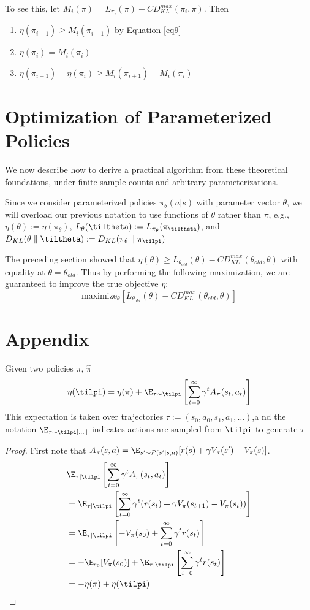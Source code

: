 \documentclass[11pt]{article}
\begin{document}
To see this, let \(M_i(\pi)=L_{\pi_i}(\pi)-CD_{KL}^{max}(\pi_i,\pi)\). Then
\begin{enumerate}
\item \(\eta(\pi_{i+1})\ge M_i(\pi_{i+1})\) by Equation \eqref{eq9}
\item \(\eta(\pi_i)=M_i(\pi_i)\)
\item \(\eta(\pi_{i+1})-\eta(\pi_i)\ge M_i(\pi_{i+1})-M_i(\pi_i)\)
\end{enumerate}
\section{Optimization of Parameterized Policies}
\label{sec:org5462e45}
We now describe how to derive a practical algorithm from these theoretical foundations, under finite
sample counts and arbitrary parameterizations.

Since we consider parameterized policies \(\pi_\theta(a|s)\) with parameter vector \(\theta\), we will overload our previous
notation to use functions of \(\theta\) rather than \(\pi\), e.g., \(\eta(\theta):=\eta(\pi_\theta)\),
\(L_\theta(\tiltheta):=L_{\pi_\theta}(\pi_{\tiltheta})\), and \(D_{KL}(\theta\parallel\tiltheta):=D_{KL}(\pi_\theta\parallel\pi_{\tilpi})\)

The preceding section showed that \(\eta(\theta)\ge L_{\theta_{old}}(\theta)-CD_{KL}^{max}(\theta_{old},\theta)\)
with equality at \(\theta=\theta_{old}\). Thus by performing the following maximization, we are guaranteed to improve
the true objective \(\eta\):
\begin{equation*}
\text{maximize}_\theta[L_{\theta_{old}}(\theta)-CD_{KL}^{max}(\theta_{old},\theta)]
\end{equation*}
\section{Appendix}
\label{sec:org779c0ab}
\begin{lemma}[]
Given two policies \(\pi\), \(\hat{\pi}\)
\begin{equation*}
\eta(\tilpi)=\eta(\pi)+\E_{\tau\sim\tilpi}\left[ \sum_{t=0}^\infty\gamma^tA_\pi(s_t,a_t) \right]
\end{equation*}
This expectation is taken over trajectories \(\tau:=(s_0,a_0,s_1,a_1,\dots)\),a nd the notation \(\E_{\tau\sim\tilpi[\dots]}\)
indicates actions are sampled from \(\tilpi\) to generate \(\tau\)
\end{lemma}

\begin{proof}
First note that \(A_\pi(s,a)=\E_{s'\sim P(s'|s,a)}[r(s)+\gamma V_\pi(s')-V_\pi(s)]\).
\begin{align*}
&\E_{\tau|\tilpi}\left[ \sum_{t=0}^\infty\gamma^tA_\pi(s_t,a_t) \right]\\
&=\E_{\tau|\tilpi}\left[ \sum_{t=0}^\infty\gamma^t(r(s_t)+\gamma V_\pi(s_{t+1})-V_\pi(s_t)) \right]\\
&=\E_{\tau|\tilpi}\left[ -V_\pi(s_0)+\sum_{t=0}^\infty\gamma^tr(s_t) \right]\\
&=-\E_{s_0}[V_\pi(s_0)]+\E_{\tau|\tilpi}\left[ \sum_{i=0}^\infty\gamma^tr(s_t) \right]\\
&=-\eta(\pi)+\eta(\tilpi)
\end{align*}
\end{proof}
\end{document}
